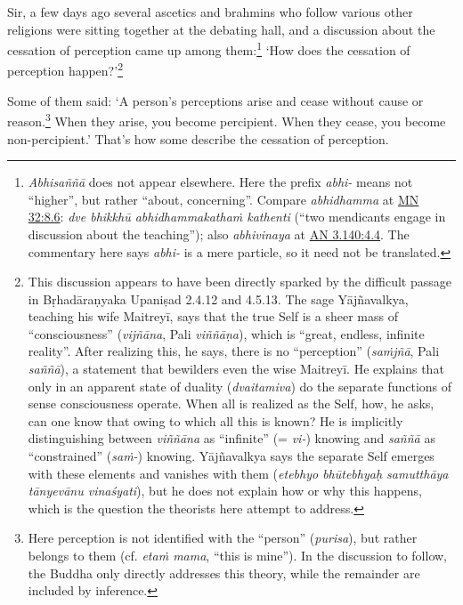 \documentclass[12pt,openany]{book}%
\begin{document}
Sir, a few days ago several ascetics and brahmins who follow various other religions were sitting together at the debating hall, and a discussion about the cessation of perception came up among them:\footnote{\textit{\textsanskrit{Abhisaññā}} does not appear elsewhere. Here the prefix \textit{abhi-} means not “higher”, but rather “about, concerning”. Compare \textit{abhidhamma} at \href{https://suttacentral.net/mn32/en/sujato\#8.6}{MN 32:8.6}: \textit{dve \textsanskrit{bhikkhū} \textsanskrit{abhidhammakathaṁ} kathenti} (“two mendicants engage in discussion about the teaching”); also \textit{abhivinaya} at \href{https://suttacentral.net/an3.140/en/sujato\#4.4}{AN 3.140:4.4}. The commentary here says \textit{abhi-} is a mere particle, so it need not be translated. } ‘How does the cessation of perception happen?’\footnote{This discussion appears to have been directly sparked by the difficult passage in \textsanskrit{Bṛhadāraṇyaka} \textsanskrit{Upaniṣad} 2.4.12 and 4.5.13. The sage \textsanskrit{Yājñavalkya}, teaching his wife \textsanskrit{Maitreyī}, says that the true Self is a sheer mass of “consciousness” (\textit{\textsanskrit{vijñāna}}, Pali \textit{\textsanskrit{viññāṇa}}), which is “great, endless, infinite reality”. After realizing this, he says, there is no “perception” (\textit{\textsanskrit{saṁjñā}}, Pali \textit{\textsanskrit{saññā}}), a statement that bewilders even the wise \textsanskrit{Maitreyī}. He explains that only in an apparent state of duality (\textit{dvaitamiva}) do the separate functions of sense consciousness operate. When all is realized as the Self, how, he asks, can one know that owing to which all this is known? He is implicitly distinguishing between \textit{\textsanskrit{viññāna}} as “infinite” (= \textit{vi-}) knowing and \textit{\textsanskrit{saññā}} as “constrained” (\textit{\textsanskrit{saṁ}-}) knowing. \textsanskrit{Yājñavalkya} says the separate Self emerges with these elements and vanishes with them (\textit{etebhyo \textsanskrit{bhūtebhyaḥ} \textsanskrit{samutthāya} \textsanskrit{tānyevānu} \textsanskrit{vinaśyati}}), but he does not explain how or why this happens, which is the question the theorists here attempt to address. } 

Some of them said: ‘A person’s perceptions arise and cease without cause or reason.\footnote{Here perception is not identified with the “person” (\textit{purisa}), but rather belongs to them (cf. \textit{\textsanskrit{etaṁ} mama}, “this is mine”). In the discussion to follow, the Buddha only directly addresses this theory, while the remainder are included by inference. } When they arise, you become percipient. When they cease, you become non-percipient.’ That’s how some describe the cessation of perception. 
\end{document}

